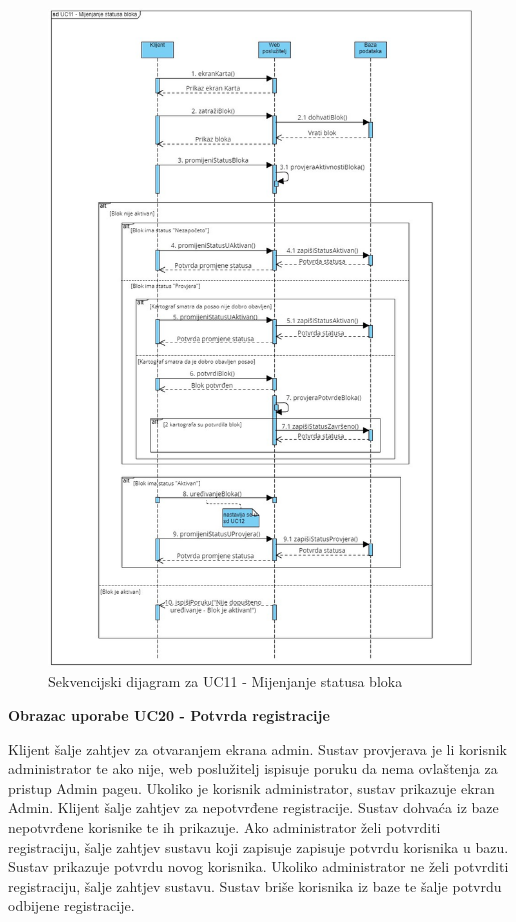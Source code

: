                 \begin{figure}[H] \includegraphics[width=\linewidth]{./dijagrami/MijenjanjeStatusaBloka.jpg}
				    \caption{Sekvencijski dijagram za UC11 - Mijenjanje statusa bloka}
				    \end{figure}
                
                \eject

                \textbf{Obrazac uporabe UC20 - Potvrda registracije}

                Klijent šalje zahtjev za otvaranjem ekrana admin. Sustav provjerava je li korisnik administrator te ako nije, web poslužitelj ispisuje poruku da nema ovlaštenja za pristup Admin pageu. Ukoliko je korisnik administrator, sustav prikazuje ekran Admin. Klijent šalje zahtjev za nepotvrđene registracije. Sustav dohvaća iz baze nepotvrđene korisnike te ih prikazuje. Ako administrator želi potvrditi registraciju, šalje zahtjev sustavu koji zapisuje zapisuje potvrdu korisnika u bazu. Sustav prikazuje potvrdu novog korisnika. Ukoliko administrator ne želi potvrditi registraciju, šalje zahtjev sustavu. Sustav briše korisnika iz baze te šalje potvrdu odbijene registracije. 


